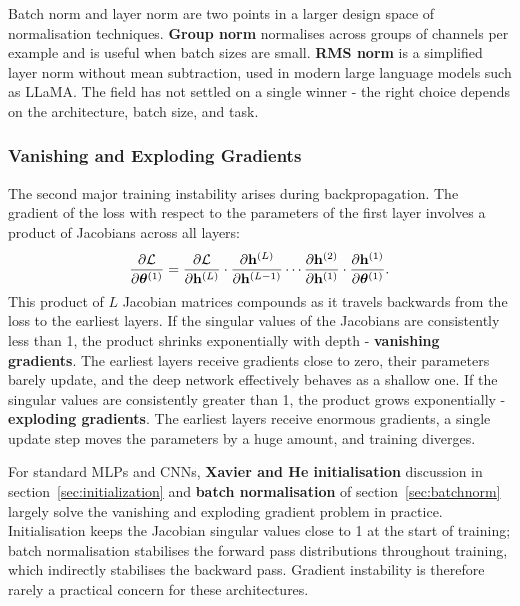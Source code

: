 Batch norm and layer norm are two points in a larger design space of normalisation techniques. \textbf{Group norm} normalises across groups of channels per example and is useful when batch sizes are small. \textbf{RMS norm} is a simplified layer norm without mean subtraction, used in modern large language models such as LLaMA. The field has not settled on a single winner - the right choice depends on the architecture, batch size, and task.

\subsubsection{Vanishing and Exploding Gradients}

The second major training instability arises during backpropagation. The gradient of the loss with respect to the parameters of the first layer involves a product of Jacobians across all layers:
\begin{equation}
    \frac{\partial \mathcal{L}}{\partial \boldsymbol{\theta}^{(1)}} =
    \frac{\partial \mathcal{L}}{\partial \mathbf{h}^{(L)}}
    \cdot \frac{\partial \mathbf{h}^{(L)}}{\partial \mathbf{h}^{(L-1)}}
    \cdots
    \frac{\partial \mathbf{h}^{(2)}}{\partial \mathbf{h}^{(1)}}
    \cdot \frac{\partial \mathbf{h}^{(1)}}{\partial \boldsymbol{\theta}^{(1)}}.
\end{equation}
This product of $L$ Jacobian matrices compounds as it travels backwards from the loss to the earliest layers. If the singular values of the Jacobians are consistently less than 1, the product shrinks exponentially with depth - \textbf{vanishing gradients}. The earliest layers receive gradients close to zero, their parameters barely update, and the deep network effectively behaves as a shallow one. If the singular values are consistently greater than 1, the product grows exponentially - \textbf{exploding gradients}. The earliest layers receive enormous gradients, a single update step moves the parameters by a huge amount, and training diverges.

For standard MLPs and CNNs, \textbf{Xavier and He initialisation} discussion in section~\ref{sec:initialization} and \textbf{batch normalisation} of section~\ref{sec:batchnorm} largely solve the vanishing and exploding gradient problem in practice. Initialisation keeps the Jacobian singular values close to 1 at the start of training; batch normalisation stabilises the forward pass distributions throughout training, which indirectly stabilises the backward pass. Gradient instability is therefore rarely a practical concern for these architectures.

